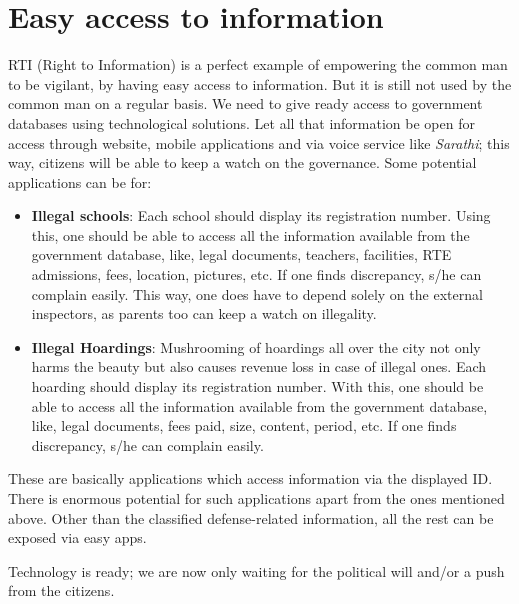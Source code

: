 \documentclass[12pt]{article}
\begin{document}
\section*{Easy access to information}
RTI (Right to Information) is a perfect example of empowering the common man to be vigilant,  by having easy access to information. But it is still not used by the  common man on a regular basis. We need to give ready access to government databases using technological solutions. Let all that information be open for access through website, mobile applications and via voice service like {\em Sarathi}; this way, citizens will be able to keep a watch on the governance. Some potential applications can be for:
\begin{itemize}
\item \textbf{Illegal schools}: Each school should display its registration number. Using this, one should be able to access all the information available from the  government database, like, legal documents, teachers, facilities, RTE admissions, fees, location, pictures, etc. If one finds discrepancy, s/he can complain easily. This way, one does have to depend solely on the external inspectors, as parents too can keep a watch on illegality.
\item \textbf{Illegal Hoardings}: Mushrooming of hoardings all over the city not only harms the beauty but also causes revenue loss in case of illegal ones. Each hoarding should display its registration number. With this, one should be able to access all the information available from the government database, like, legal documents, fees paid, size, content, period, etc. If one finds discrepancy, s/he can complain easily.
\end{itemize}
These are basically applications which access information via the displayed ID. There is enormous potential  for such applications apart from the ones mentioned above. Other than the classified defense-related information, all the rest can be exposed via easy apps. 

Technology is ready;  we are now only waiting for the political will and/or a push from  the citizens.
\end{document}
